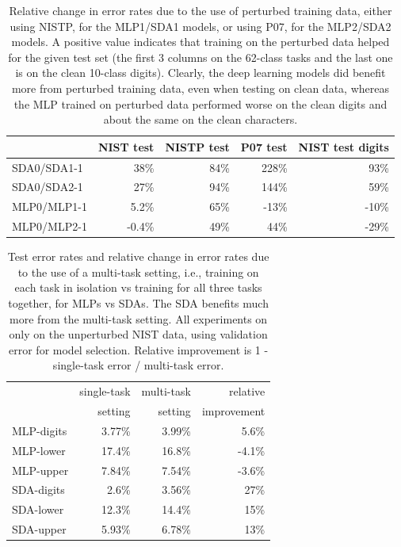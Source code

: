 \documentclass{article} %
\begin{document}
\begin{table}[ht]
\caption{Relative change in error rates due to the use of perturbed training data,
either using NISTP, for the MLP1/SDA1 models, or using P07, for the MLP2/SDA2 models.
A positive value indicates that training on the perturbed data helped for the
given test set (the first 3 columns on the 62-class tasks and the last one is
on the clean 10-class digits). Clearly, the deep learning models did benefit more
from perturbed training data, even when testing on clean data, whereas the MLP
trained on perturbed data performed worse on the clean digits and about the same
on the clean characters. }
\label{tab:perturbation-effect}
\begin{center}
\begin{tabular}{|l|r|r|r|r|} \hline
      & NIST test          & NISTP test      & P07 test       & NIST test digits   \\ \hline
SDA0/SDA1-1   &  38\%      &  84\%           & 228\%          &  93\% \\ \hline 
SDA0/SDA2-1   &  27\%      &  94\%           & 144\%          &  59\% \\ \hline 
MLP0/MLP1-1   &  5.2\%     &  65\%           & -13\%          & -10\%  \\ \hline 
MLP0/MLP2-1   &  -0.4\%    &  49\%           & 44\%           & -29\% \\ \hline 
\end{tabular}
\end{center}
\end{table}

\begin{table}[ht]
\caption{Test error rates and relative change in error rates due to the use of
a multi-task setting, i.e., training on each task in isolation vs training
for all three tasks together, for MLPs vs SDAs. The SDA benefits much
more from the multi-task setting. All experiments on only on the
unperturbed NIST data, using validation error for model selection.
Relative improvement is 1 - single-task error / multi-task error.}
\label{tab:multi-task}
\begin{center}
\begin{tabular}{|l|r|r|r|} \hline
             & single-task  & multi-task  & relative \\ 
             & setting      & setting     & improvement \\ \hline
MLP-digits   &  3.77\%      &  3.99\%     & 5.6\%   \\ \hline 
MLP-lower   &  17.4\%      &  16.8\%     &  -4.1\%    \\ \hline 
MLP-upper   &  7.84\%     &  7.54\%      & -3.6\%    \\ \hline 
SDA-digits   &  2.6\%      &  3.56\%     & 27\%    \\ \hline 
SDA-lower   &  12.3\%      &  14.4\%    & 15\%    \\ \hline 
SDA-upper   &  5.93\%     &  6.78\%      & 13\%    \\ \hline 
\end{tabular}
\end{center}
\end{table}

\clearpage
{


%
%
}
\end{document}

